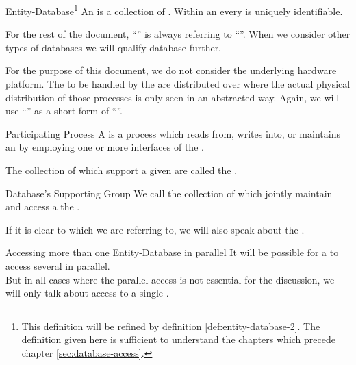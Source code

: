 \documentclass[a4paper, 12pt]{book}
\begin{document}
\begin{definition*}{Entity-Database\footnote{This definition will be refined
  by definition \vref{def:entity-database-2}. The definition given here is sufficient
  to understand the chapters which precede chapter \vref{sec:database-access}.}}
  \label{def:entity-database}
  An  is a collection of . Within an
   every  is uniquely identifiable.
\end{definition*}

For the rest of the document, ``'' is always referring to
``''. When we consider other types of databases we will
qualify database further.
%

For the purpose of this document, we do not consider the underlying hardware
platform. The  to be handled by the \SYNEIGHT are distributed over
 where the actual physical distribution of those
processes is only seen in an abstracted way. Again, we will use ``'' as
a short form of ``''.
\begin{definition*}{Participating Process}
  \label{def:participating-process}
  A  is a process which reads from, writes into, or
  maintains an  by employing one or more interfaces of the
  \SYNEIGHT.
\end{definition*}
The collection of  which support a given
 are called the . 
\begin{definition*}{Database's Supporting Group}
  \label{def:supporting-participating-process}
  We call the collection of  which jointly
  maintain and access a  the . 
\end{definition*}
%
If it is clear to which  we are referring to, we will also speak
about the .
%
\begin{remark*}{Accessing more than one Entity-Database in parallel}
  It will be possible for a  to access several
   in parallel.\\
  But in all cases where the parallel access is not essential for the
  discussion, we will only talk about access to a single .
\end{remark*}
\end{document}
